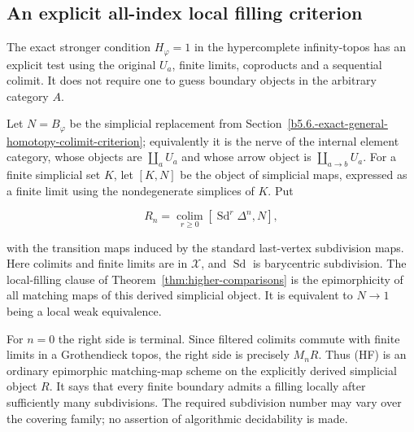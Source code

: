 \documentclass[11pt,a4paper]{article}
\theoremstyle{definition}
\begin{document}
\subsection{An explicit all-index local filling
criterion}\label{b5.10.-an-explicit-all-index-local-filling-criterion}

The
exact stronger condition \(H_\varphi=1\) in the hypercomplete
infinity-topos has an explicit test using the original \(U_a\), finite
limits, coproducts and a sequential colimit. It does not require one to
guess boundary objects in the arbitrary category \(A\).

Let \(N=B_\varphi\) be the simplicial replacement from Section~\ref{b5.6.-exact-general-homotopy-colimit-criterion};
equivalently it is the nerve of the internal element category, whose
objects are \(\coprod_aU_a\) and whose arrow object is
\(\coprod_{a\to b}U_a\). For a finite simplicial set \(K\), let
\([K,N]\) be the object of simplicial maps, expressed as a finite limit
using the nondegenerate simplices of \(K\). Put

\[R_n=\operatorname*{colim}_{r\ge0}[\operatorname{Sd}^{r}\Delta^n,N],\]

with the transition maps induced by the standard last-vertex subdivision
maps. Here colimits and finite limits are in \(\mathcal X\), and
\(\operatorname{Sd}\) is barycentric subdivision. The local-filling clause of Theorem~\ref{thm:higher-comparisons} is the epimorphicity of all matching maps of this derived simplicial object. It is equivalent to \(N\to1\) being a local weak equivalence.

For \(n=0\) the right side is terminal. Since filtered colimits commute
with finite limits in a Grothendieck topos, the right side is precisely
\(M_nR\). Thus (HF) is an ordinary epimorphic matching-map scheme on the
explicitly derived simplicial object \(R\). It says that every finite
boundary admits a filling locally after sufficiently many subdivisions.
The required subdivision number may vary over the covering family; no
assertion of algorithmic decidability is made.
\end{document}
